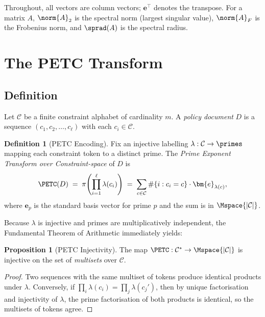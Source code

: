 \documentclass[12pt,letterpaper]{article}
\theoremstyle{definition}
\newtheorem{definition}{Definition}[section]
\newtheorem{proposition}{Proposition}[section]
\theoremstyle{remark}
\begin{document}
Throughout, all vectors are column vectors; \(\bm{e}^\top\) denotes the
transpose.  For a matrix \(A\), \(\norm{A}_2\) is the spectral norm
(largest singular value), \(\norm{A}_F\) is the Frobenius norm, and
\(\sprad(A)\) is the spectral radius.

\section{The PETC Transform}
\label{sec:petc}

\subsection{Definition}
\label{ssec:petc-def}

Let \(\mathcal{C}\) be a finite constraint alphabet of cardinality \(m\).
A \emph{policy document} \(D\) is a sequence
\((c_1, c_2, \ldots, c_\ell)\) with each \(c_i \in \mathcal{C}\).

\begin{definition}[PETC Encoding]
  \label{def:petc}
  Fix an injective labelling \(\lambda : \mathcal{C} \to \primes\) mapping
  each constraint token to a distinct prime.  The
  \emph{Prime Exponent Transform over Constraint-space} of \(D\) is
  \[
    \PETC(D) \;=\; \pi\!\left(\prod_{i=1}^{\ell} \lambda(c_i)\right)
    \;=\; \sum_{c \in \mathcal{C}} \#\{i : c_i = c\}\cdot\bm{e}_{\lambda(c)},
  \]
  where \(\bm{e}_p\) is the standard basis vector for prime \(p\) and the sum
  is in \(\Mspace{|\mathcal{C}|}\).
\end{definition}

\noindent
Because \(\lambda\) is injective and primes are multiplicatively independent,
the Fundamental Theorem of Arithmetic immediately yields:

\begin{proposition}[PETC Injectivity]
  \label{prop:petc-inj}
  The map \(\PETC : \mathcal{C}^* \to \Mspace{|\mathcal{C}|}\) is injective
  on the set of \emph{multisets} over \(\mathcal{C}\).
\end{proposition}

\begin{proof}
  Two sequences with the same multiset of tokens produce identical products
  under \(\lambda\).  Conversely, if
  \(\prod_i \lambda(c_i) = \prod_j \lambda(c_j')\), then by unique
  factorisation and injectivity of \(\lambda\), the prime factorisation of
  both products is identical, so the multisets of tokens agree.
\end{proof}
\end{document}
